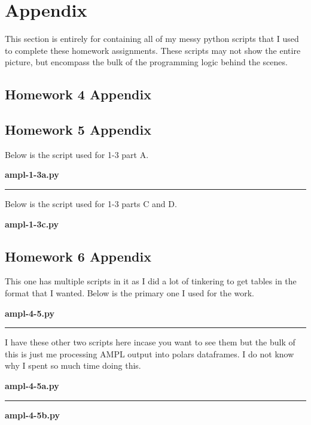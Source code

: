 \section*{Appendix}

This section is entirely for containing all of my messy python scripts that I used to complete these homework assignments. These scripts may not show the entire picture, but encompass the bulk of the programming logic behind the scenes.

\subsection*{Homework 4 Appendix}



\pagebreak
\subsection*{Homework 5 Appendix}

Below is the script used for 1-3 part A.

\textbf{ampl-1-3a.py}



\vspace{1cm}
\hrule
\vspace{1cm}

Below is the script used for 1-3 parts C and D.

\textbf{ampl-1-3c.py}



\pagebreak
\subsection*{Homework 6 Appendix}

This one has multiple scripts in it as I did a lot of tinkering to get tables in the format that I wanted. Below is the primary one I used for the work.

\textbf{ampl-4-5.py}



\vspace{1cm}
\hrule
\vspace{1cm}

I have these other two scripts here incase you want to see them but the bulk of this is just me processing AMPL output into polars dataframes. I do not know why I spent so much time doing this.

\textbf{ampl-4-5a.py}



\vspace{1cm}
\hrule
\vspace{1cm}

\textbf{ampl-4-5b.py}


